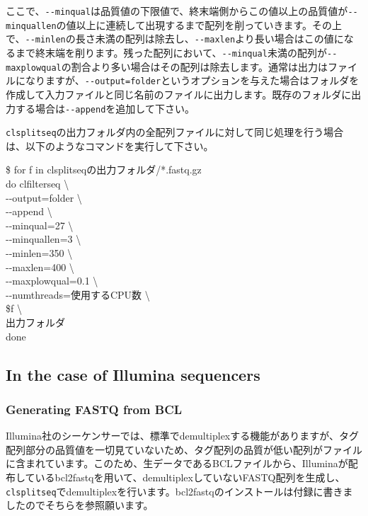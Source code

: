 \documentclass[titlepage,10pt,a4paper,english]{jsbook}
\newenvironment{cmd}{\begin{oframed}\raggedright\ttfamily\footnotesize\setlength{\baselineskip}{1.4em}}{\end{oframed}\vspace{-1em}}
\begin{document}
ここで、\texttt{{-}{-}minqual}は品質値の下限値で、終末端側からこの値以上の品質値が\texttt{{-}{-}minquallen}の値以上に連続して出現するまで配列を削っていきます。その上で、\texttt{{-}{-}minlen}の長さ未満の配列は除去し、\texttt{{-}{-}maxlen}より長い場合はこの値になるまで終末端を削ります。残った配列において、\texttt{{-}{-}minqual}未満の配列が\texttt{{-}{-}maxplowqual}の割合より多い場合はその配列は除去します。通常は出力はファイルになりますが、\texttt{{-}{-}output=folder}というオプションを与えた場合はフォルダを作成して入力ファイルと同じ名前のファイルに出力します。既存のフォルダに出力する場合は\texttt{{-}{-}append}を追加して下さい。

\texttt{clsplitseq}の出力フォルダ内の全配列ファイルに対して同じ処理を行う場合は、以下のようなコマンドを実行して下さい。

\begin{cmd}
\$ for f in clsplitseqの出力フォルダ/*.fastq.gz\\
do clfilterseq {\textbackslash}\\
{-}{-}output=folder {\textbackslash}\\
{-}{-}append {\textbackslash}\\
{-}{-}minqual=27 {\textbackslash}\\
{-}{-}minquallen=3 {\textbackslash}\\
{-}{-}minlen=350 {\textbackslash}\\
{-}{-}maxlen=400 {\textbackslash}\\
{-}{-}maxplowqual=0.1 {\textbackslash}\\
{-}{-}numthreads=使用するCPU数 {\textbackslash}\\
\$f {\textbackslash}\\
出力フォルダ\\
done
\end{cmd}

\subsection{In the case of Illumina sequencers}

\subsubsection{Generating FASTQ from BCL}

Illumina社のシーケンサーでは、標準でdemultiplexする機能がありますが、タグ配列部分の品質値を一切見ていないため、タグ配列の品質が低い配列がファイルに含まれています。このため、生データであるBCLファイルから、Illuminaが配布しているbcl2fastqを用いて、demultiplexしていないFASTQ配列を生成し、\texttt{clsplitseq}でdemultiplexを行います。bcl2fastqのインストールは付録に書きましたのでそちらを参照願います。
\end{document}
